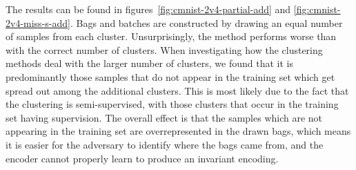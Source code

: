 The results can be found in figures~\ref{fig:cmnist-2v4-partial-add} and \ref{fig:cmnist-2v4-miss-s-add}.
Bags and batches are constructed by drawing an equal number of samples from each cluster.
Unsurprisingly, the method performs worse than with the correct number of clusters.
When investigating how the clustering methods deal with the larger number of clusters,
we found that it is predominantly those samples that do not appear in the training set
which get spread out among the additional clusters.
This is most likely due to the fact that the clustering is semi-supervised,
with those clusters that occur in the training set having supervision.
The overall effect is that the samples which are not appearing in the training set are overrepresented in the drawn bags,
which means it is easier for the adversary to identify where the bags came from,
and the encoder cannot properly learn to produce an invariant encoding.

% 
% 
% 
